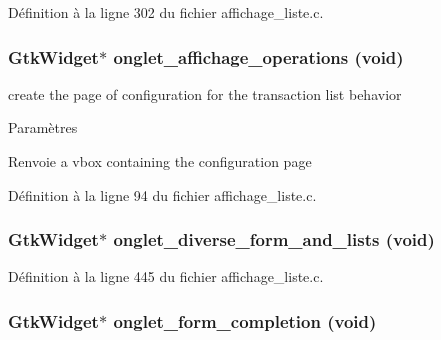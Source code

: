Définition à la ligne 302 du fichier affichage\_\-liste.c.

\subsubsection[{onglet\_\-affichage\_\-operations}]{\setlength{\rightskip}{0pt plus 5cm}GtkWidget$\ast$ onglet\_\-affichage\_\-operations (void)}\label{affichage__liste_8h_a822e762a82cda85425acf41f0be4ef90}
create the page of configuration for the transaction list behavior


\begin{DoxyParams}{Paramètres}
\item[{\em }]\end{DoxyParams}
\begin{DoxyReturn}{Renvoie}
a vbox containing the configuration page 
\end{DoxyReturn}


Définition à la ligne 94 du fichier affichage\_\-liste.c.

\subsubsection[{onglet\_\-diverse\_\-form\_\-and\_\-lists}]{\setlength{\rightskip}{0pt plus 5cm}GtkWidget$\ast$ onglet\_\-diverse\_\-form\_\-and\_\-lists (void)}\label{affichage__liste_8h_a33da4cf29fe0704c65a8d2c3fc88700c}


Définition à la ligne 445 du fichier affichage\_\-liste.c.

\subsubsection[{onglet\_\-form\_\-completion}]{\setlength{\rightskip}{0pt plus 5cm}GtkWidget$\ast$ onglet\_\-form\_\-completion (void)}\label{affichage__liste_8h_a35c31378d6ff0acbfdd295ef8dea0982}


